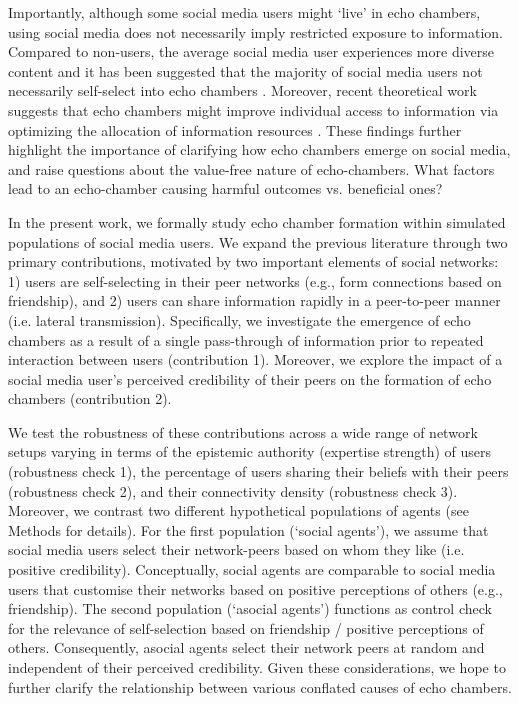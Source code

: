 \documentclass[fleqn,10pt]{wlscirep}
\begin{document}
Importantly, although some social media users might `live' in echo chambers, using social media does not necessarily imply restricted exposure to information. Compared to non-users, the average social media user experiences more diverse content \cite{newman2017reuters} and it has been suggested that the majority of social media users not necessarily self-select into echo chambers \cite{haw2020drives}. Moreover, recent theoretical work suggests that echo chambers might improve individual access to information via optimizing the allocation of information resources \cite{jann2018echo}. These findings further highlight the importance of clarifying how echo chambers emerge on social media, and raise questions about the value-free nature of echo-chambers. What factors lead to an echo-chamber causing harmful outcomes vs. beneficial ones? 

In the present work, we formally study echo chamber formation within simulated populations of social media users. We expand the previous literature through two primary contributions, motivated by two important elements of social networks: 1) users are self-selecting in their peer networks (e.g., form connections based on friendship), and 2) users can share information rapidly in a peer-to-peer manner (i.e. lateral transmission). Specifically, we investigate the emergence of echo chambers as a result of a single pass-through of information prior to repeated interaction between users (contribution 1). Moreover, we explore the impact of a social media user's perceived credibility of their peers on the formation of echo chambers (contribution 2). 

We test the robustness of these contributions across a wide range of network setups varying in terms of the epistemic authority (expertise strength) of users (robustness check 1), the percentage of users sharing their beliefs with their peers (robustness check 2), and their connectivity density (robustness check 3). Moreover, we contrast two different hypothetical populations of agents (see Methods for details). For the first population (`social agents'), we assume that social media users select their network-peers based on whom they like (i.e. positive credibility). Conceptually, social agents are comparable to social media users that customise their networks based on positive perceptions of others (e.g., friendship). The second population (`asocial agents') functions as control check for the relevance of self-selection based on friendship / positive perceptions of others. Consequently, asocial agents select their network peers at random and independent of their perceived credibility. Given these considerations, we hope to further clarify the relationship between various conflated causes of echo chambers. 
\end{document}
